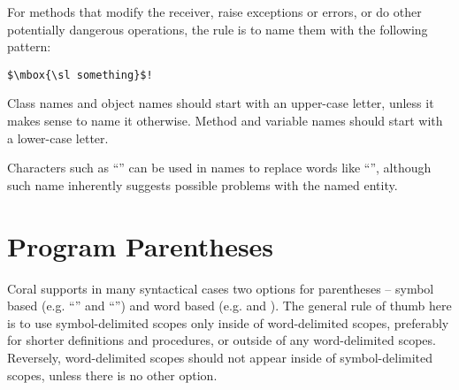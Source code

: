 For methods that modify the receiver, raise exceptions or errors, or do other potentially dangerous operations, the rule is to name them with the following pattern:
\begin{lstlisting}
$\mbox{\sl something}$!
\end{lstlisting}

Class names and object names should start with an upper-case letter, unless it makes sense to name it otherwise. Method and variable names should start with a lower-case letter. 

Characters such as ``\code{+}'' can be used in names to replace words like ``'', although such name inherently suggests possible problems with the named entity. 

\section{Program Parentheses}

Coral supports in many syntactical cases two options for parentheses -- symbol based (e.g. ``\code{(}'' and ``\code{)}'') and word based (e.g.  and ). The general rule of thumb here is to use symbol-delimited scopes only inside of word-delimited scopes, preferably for shorter definitions and procedures, or outside of any word-delimited scopes. Reversely, word-delimited scopes should not appear inside of symbol-delimited scopes, unless there is no other option. 
